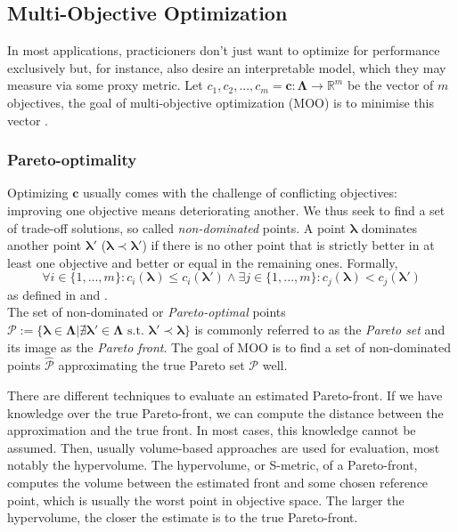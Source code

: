 \documentclass[twoside,11pt]{article}
\begin{document}
\subsection{Multi-Objective Optimization}
In most applications, practicioners don't just want to optimize for performance exclusively but, for instance, also desire an interpretable model,
which they may measure via some proxy metric.
Let $c_1,c_2,...,c_m = \boldsymbol{c}:\boldsymbol\Lambda\rightarrow\mathbb{R}^m$ be the vector of $m$ objectives, the goal of multi-objective optimization (MOO)
is to minimise this vector \citep[p. 11]{10.1145/3610536}.

\subsubsection{Pareto-optimality}
Optimizing $\boldsymbol{c}$ usually comes with the challenge of conflicting objectives: improving one objective means deteriorating another.
We thus seek to find a set of trade-off solutions, so called \textit{non-dominated} points.
A point $\boldsymbol\lambda$ dominates another point $\boldsymbol\lambda'$ ($\boldsymbol\lambda\prec\boldsymbol\lambda'$) if there is no other point that is
strictly better in at least one objective and better or equal in the remaining ones. Formally,
\begin{equation}
  \forall i\in\{1,...,m\}:c_i(\boldsymbol\lambda) \le c_i(\boldsymbol\lambda') \wedge \exists j\in\{1,...,m\}:c_j(\boldsymbol\lambda) < c_j(\boldsymbol\lambda')
  \label{eq-pareto-domination}
\end{equation}
as defined in \citep[pp. 7f]{10.1145/3610536} and \citep[pp. 198f]{genetic_algos}.
\\
The set of non-dominated or \textit{Pareto-optimal}
points $\mathcal{P}:=\{\boldsymbol\lambda\in\boldsymbol\Lambda|\nexists\boldsymbol\lambda'\in\boldsymbol\Lambda\text{ s.t. }\boldsymbol\lambda'\prec\boldsymbol\lambda\}$
is commonly referred to as the \textit{Pareto set} and its image as the \textit{Pareto front}.
The goal of MOO is to find a set of non-dominated points $\hat{\mathcal{P}}$ approximating the true Pareto set $\mathcal{P}$ well.

There are different techniques to evaluate an estimated Pareto-front. If we have knowledge over the true Pareto-front, we can compute the distance between the approximation
and the true front. In most cases, this knowledge cannot be assumed.
Then, usually volume-based approaches are used for evaluation, most notably the hypervolume. The hypervolume, or S-metric, of a Pareto-front, computes the volume between
the estimated front and some chosen reference point, which is usually the worst point in objective space.
The larger the hypervolume, the closer the estimate is to the true Pareto-front. \citep[pp. 8-10]{10.1145/3610536}
\end{document}
